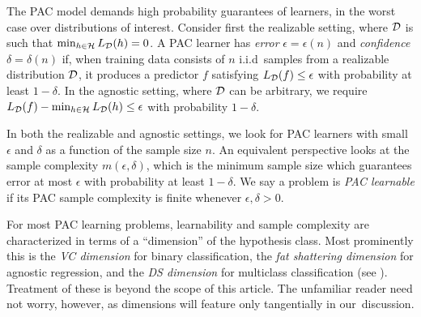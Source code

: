 The PAC model demands high probability guarantees of learners, in the worst case over distributions of interest. Consider first the realizable setting, where $\mathcal{D}$ is such that $\min_{h \in \H} L_{\D}(h) = 0$. A PAC learner has \emph{error} $\epsilon=\epsilon(n)$ and \emph{confidence} $\delta=\delta(n)$ if, when training data consists of $n$ i.i.d~samples from a realizable distribution $\mathcal{D}$, it produces a predictor $f$  satisfying $L_{\mathcal{D}}(f) \leq \epsilon$ with probability at least $1-\delta$. In the agnostic setting, where $\mathcal{D}$ can be arbitrary, we require $L_\D(f) - \min_{h \in \H} L_\D(h) \leq \epsilon$ with probability $1-\delta$.

In both the realizable and agnostic settings, we look for PAC learners with small $\epsilon$ and $\delta$ as a function of the sample size $n$. An equivalent perspective looks at the sample complexity $m(\epsilon,\delta)$, which is the minimum sample size which guarantees error  at most $\epsilon$ with probability at least $1-\delta$. We say a problem is \emph{PAC learnable} if its PAC sample complexity is finite whenever $\epsilon,\delta > 0$.

For most PAC learning problems, learnability and sample complexity are characterized in terms of a  ``dimension'' of the hypothesis class. Most prominently this is the \emph{VC dimension} for binary classification, the \emph{fat shattering dimension} for agnostic regression, and the \emph{DS dimension} for multiclass classification (see \cite{anthony_neural_1999,daniely_optimal_2014,brukhim_characterization_2022}). Treatment of these is beyond the scope of this article. The unfamiliar reader need not worry, however,  as dimensions will feature only tangentially in our~discussion.




